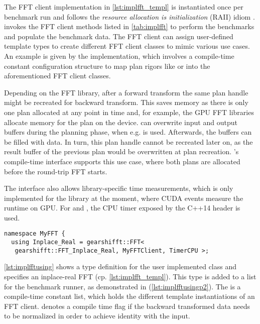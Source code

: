 The FFT client implementation in \cref{lst:implfft_templ} is instantiated once per benchmark run and follows the {\textit{resource allocation is initialization}} (RAII) idiom \cite{stroustrup1994design}. \gearshifft{} invokes the FFT client methods listed in \cref{tab:implfft} to perform the benchmarks and populate the benchmark data. The FFT client can assign user-defined template types to create different FFT client classes to mimic various use cases. An example is given by the \fftw{} implementation, which involves a compile-time constant configuration structure to map plan rigors like  or  into the aforementioned FFT client classes.

Depending on the FFT library, after a forward transform the same plan handle might be recreated for backward transform. This saves memory as there is only one plan allocated at any point in time and, for example, the GPU FFT libraries allocate memory for the plan on the device. \fftw{} can overwrite input and output buffers during the planning phase, when e.g.  is used. Afterwards, the buffers can be filled with data. In turn, this plan handle cannot be recreated later on, as the result buffer of the previous plan would be overwritten at plan recreation. \gearshifft{}'s compile-time interface supports this use case, where both plans are allocated before the round-trip FFT starts.

The \gearshifft{} interface also allows library-specific time measurements, which is only implemented for the \cufft{} library at the moment, where CUDA events measure the runtime on GPU. For \fftw{} and \clfft{}, the CPU timer exposed by the C++14  header is used.

\begin{lstlisting}[caption={Define FFT client types for corresponding FFTs},label={lst:implfftusing}]
namespace MyFFT { 
  using Inplace_Real = gearshifft::FFT<
   gearshifft::FFT_Inplace_Real, MyFFTClient, TimerCPU >;
\end{lstlisting}

\cref{lst:implfftusing} shows a type definition for the user implemented class  and specifies an inplace-real FFT (cp. \cref{lst:implfft_templ}).
This type is added to a list for the benchmark runner, as demonstrated in  (\cref{lst:implfftusingp2}). The  is a compile-time constant list, which holds the different template instantiations of an FFT client.  denotes a compile time flag if the backward transformed data needs to be normalized in order to achieve identity with the input.


